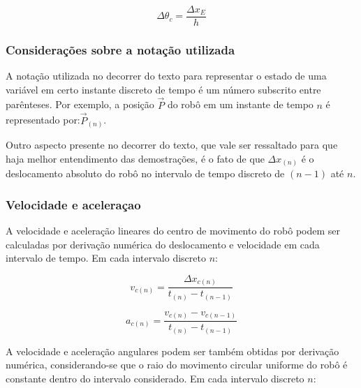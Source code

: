 \begin{equation}
  \Delta \theta_c = \frac{\Delta x_E}{h}
  \label{eq:caso_especial2_theta2}
\end{equation}

\subsubsection{Considerações sobre a notação utilizada}

A notação utilizada no decorrer do texto para representar o estado de uma variável em certo instante discreto de tempo é um número subscrito entre parênteses. Por exemplo, a posição $\overrightarrow{P}$ do robô em um instante de tempo $n$ é representado por:$\overrightarrow{P}_{(n)}$. 

Outro aspecto presente no decorrer do texto, que vale ser ressaltado para que haja melhor entendimento das demostrações, é o fato de que $\Delta x_{(n)}$ é o deslocamento absoluto do robô no intervalo de tempo discreto de $(n-1)$ até $n$.

%

\subsubsection{Velocidade e aceleraçao}

A velocidade e aceleração lineares do centro de movimento do robô podem ser calculadas por derivação numérica do deslocamento e velocidade em cada intervalo de tempo. Em cada intervalo discreto $n$:

\begin{equation}
  v_{c (n)} = \frac{\Delta x_{c (n)} }{t_{(n)} - t_{(n-1)}}
  \label{eq:velocidade_encoders}
\end{equation}

\begin{equation}
  a_{c (n)} = \frac{v_{c (n)} - v_{c (n-1)}}{t_{(n)} - t_{(n-1)}}
  \label{eq:aceleracao_encoders}
\end{equation}


A velocidade e aceleração angulares podem ser também obtidas por derivação numérica, considerando-se que o raio do movimento circular uniforme do robô é constante dentro do intervalo considerado. Em cada intervalo discreto $n$:

